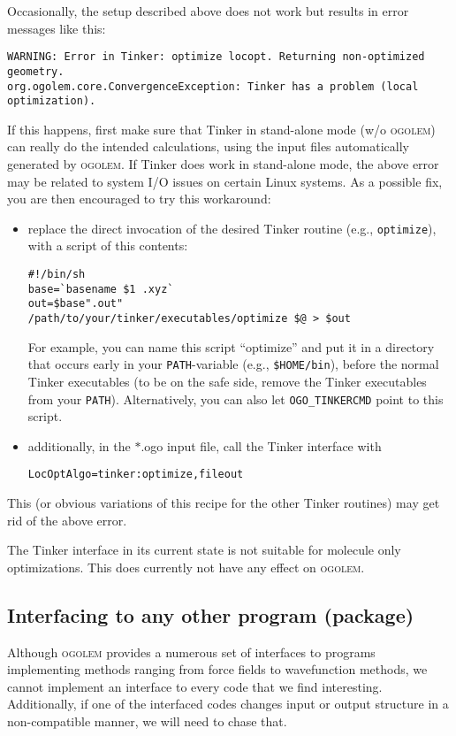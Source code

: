 \documentclass[a4paper,10pt]{scrbook}
\newcommand{\ogo}{\textsc{ogolem}}
\begin{document}
Occasionally, the setup described above does not work but results in
error messages like this:
\begin{verbatim}
WARNING: Error in Tinker: optimize locopt. Returning non-optimized geometry. 
org.ogolem.core.ConvergenceException: Tinker has a problem (local optimization).
\end{verbatim}
If this happens, first make sure that Tinker in stand-alone mode (w/o \ogo{})
can really do the intended calculations, using the input files automatically
generated by \ogo{}. If Tinker does work in stand-alone mode, the above error
may be related to system I/O issues on certain Linux systems. As a
possible fix, you are then encouraged to try this workaround:
\begin{itemize}
\item replace the direct invocation of the desired Tinker routine (e.g.,
  \texttt{optimize}), with a script of this contents:
\begin{verbatim}
#!/bin/sh
base=`basename $1 .xyz`
out=$base".out"
/path/to/your/tinker/executables/optimize $@ > $out
\end{verbatim}
  For example, you can name this script ``optimize'' and put it in a directory
  that occurs early in your \texttt{PATH}-variable (e.g.,
  \texttt{\$HOME/bin}), before the normal Tinker executables (to be on the
  safe side, remove the Tinker executables from your
  \texttt{PATH}). Alternatively, you can also let \texttt{OGO\_TINKERCMD} point
  to this script.
\item additionally, in the $\ast$.ogo input file, call the Tinker interface with
\begin{verbatim}
LocOptAlgo=tinker:optimize,fileout
\end{verbatim}
\end{itemize}
This (or obvious variations of this recipe for the other Tinker routines) may
get rid of the above error.

The Tinker interface in its current state is not suitable for molecule only
optimizations. This does currently not have any effect on \ogo{}.

\subsection{Interfacing to \textbf{any} other program (package)}
Although \ogo{} provides a numerous set of interfaces to programs implementing
methods ranging from force fields to wavefunction methods, we cannot implement
an interface to every code that we find interesting. Additionally, if one of the
interfaced codes changes input or output structure in a non-compatible manner,
we will need to chase that.
\end{document}
